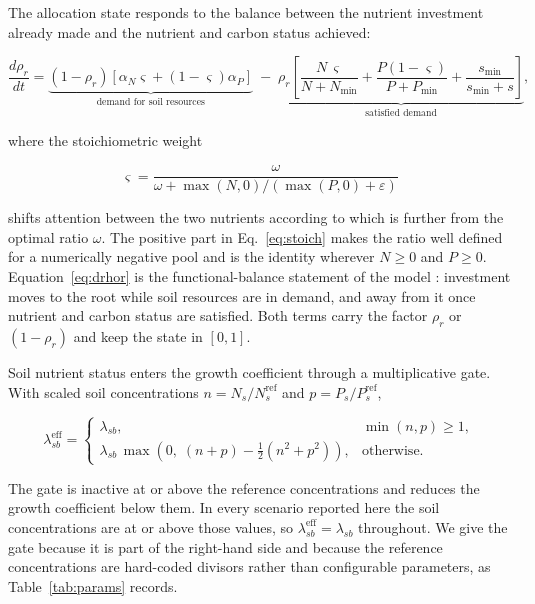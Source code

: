 The allocation state responds to the balance between the nutrient investment
already made and the nutrient and carbon status achieved:

\begin{equation}
\frac{d\rho_r}{dt}
= \underbrace{\left(1-\rho_r\right)
\left[\alpha_N \varsigma + \left(1-\varsigma\right)\alpha_P\right]}_{\text{demand for soil resources}}
\;-\;
\underbrace{\rho_r
\left[
\frac{N\,\varsigma}{N+N_{\min}}
+ \frac{P\left(1-\varsigma\right)}{P+P_{\min}}
+ \frac{s_{\min}}{s_{\min}+s}
\right]}_{\text{satisfied demand}} ,
\label{eq:drhor}
\end{equation}

where the stoichiometric weight

\begin{equation}
\varsigma = \frac{\omega}{\omega + \max(N,0)/\left(\max(P,0)+\varepsilon\right)}
\label{eq:stoich}
\end{equation}

shifts attention between the two nutrients according to which is further from
the optimal ratio $\omega$. The positive part in Eq.~\eqref{eq:stoich} makes the
ratio well defined for a numerically negative pool and is the identity wherever
$N \geq 0$ and $P \geq 0$. Equation~\eqref{eq:drhor} is the functional-balance
statement of the model \citep{Thornley1972,ThornleyJohnson1990}: investment
moves to the root while soil resources are in demand, and away from it once
nutrient and carbon status are satisfied. Both terms carry the factor
$\rho_r$ or $(1-\rho_r)$ and keep the state in $[0,1]$.

Soil nutrient status enters the growth coefficient through a multiplicative
gate. With scaled soil concentrations $n = N_s/N_s^{\mathrm{ref}}$ and
$p = P_s/P_s^{\mathrm{ref}}$,

\begin{equation}
\lambda_{sb}^{\mathrm{eff}} =
\begin{cases}
\lambda_{sb}, & \min(n,p) \geq 1, \\[4pt]
\lambda_{sb}\,\max\!\left(0,\; \left(n+p\right) - \tfrac{1}{2}\left(n^{2}+p^{2}\right)\right),
& \text{otherwise} .
\end{cases}
\label{eq:lambda_gate}
\end{equation}

The gate is inactive at or above the reference concentrations and reduces the
growth coefficient below them. In every scenario reported here the soil
concentrations are at or above those values, so
$\lambda_{sb}^{\mathrm{eff}} = \lambda_{sb}$ throughout. We give the gate because
it is part of the right-hand side and because the reference concentrations are
hard-coded divisors rather than configurable parameters, as
Table~\ref{tab:params} records.

